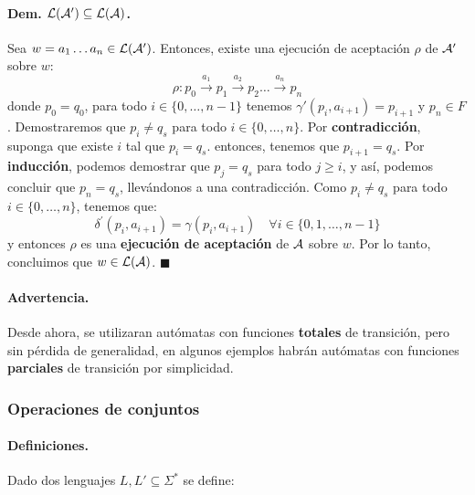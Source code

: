 \paragraph{Dem. $\mathcal{L}(\mathcal{A}') \subseteq \mathcal{L}(\mathcal{A})$.} Sea $w = a_1\ldots a_n \in \mathcal{L}(\mathcal{A}')$. Entonces, existe una ejecución de aceptación $\rho$ de $\mathcal{A}'$ sobre $w$:
$$
    \rho: p_0 \stackrel{a_1}{\rightarrow} p_1 \stackrel{a_2}{\rightarrow} p_2 \ldots \overset{a_n}{\rightarrow} p_n
$$
donde $p_0 = q_0$, para todo $i \in \{0,\ldots,n-1\}$ tenemos $\gamma'(p_i,a_{i+1}) = p_{i+1}$ y $p_n \in F$. Demostraremos que $p_i \neq q_s$ para todo $i \in \{0,\ldots, n\}$. Por \textbf{contradicción}, suponga que existe $i$ tal que $p_i = q_s$. entonces, tenemos que $p_{i+1} = q_s$. Por \textbf{inducción}, podemos demostrar que $p_j = q_s$ para todo $j \ge i$, y así, podemos concluir que $p_n = q_s$, llevándonos a una contradicción. Como $p_i \neq q_s$ para todo $i \in \{0, \ldots, n\}$, tenemos que:
$$
    \delta^{\prime}\left(p_i, a_{i+1}\right)=\gamma\left(p_i, a_{i+1}\right) \quad \forall i \in\{0,1, \ldots, n-1\}
$$
y entonces $\rho$ es una \textbf{ejecución de aceptación} de $\mathcal{A}$ sobre $w$. Por lo tanto, concluimos que $w \in \mathcal{L}(\mathcal{A})$. \hfill $\blacksquare$

\paragraph{Advertencia.} Desde ahora, se utilizaran autómatas con funciones \textbf{totales} de transición, pero sin pérdida de generalidad, en algunos ejemplos habrán autómatas con funciones \textbf{parciales} de transición por simplicidad.

\subsubsection{Operaciones de conjuntos}
\paragraph{Definiciones.} Dado dos lenguajes $L,L' \subseteq \Sigma^*$ se define:

